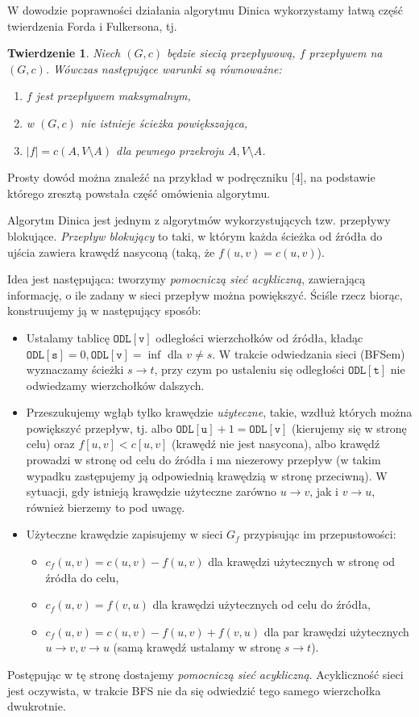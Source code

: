 \documentclass{article}
\newtheorem{twi}{Twierdzenie}
\begin{document}
W dowodzie poprawności działania algorytmu Dinica wykorzystamy łatwą część twierdzenia Forda i Fulkersona, tj.
\begin{twi} Niech $(G,c)$ będzie siecią przepływową, $f$ przepływem na $(G,c)$. Wówczas następujące warunki są równoważne:
  \begin{enumerate}
   \item $f$ jest przepływem maksymalnym, 
   \item w $(G,c)$ nie istnieje ścieżka powiększająca,
   \item $|f| = c(A, V\setminus A)$ dla pewnego przekroju $A, V\setminus A$.
  \end{enumerate}
\end{twi}
Prosty dowód można znaleźć na przykład w podręczniku [4], na podstawie którego zresztą powstała część omówienia algorytmu.

Algorytm Dinica jest jednym z algorytmów wykorzystujących tzw. przepływy blokujące. \emph{Przepływ blokujący} to taki, w którym każda ścieżka od źródła do ujścia zawiera krawędź nasyconą (taką, że $f(u,v) = c(u,v)$).

Idea jest następująca: tworzymy \emph{pomocniczą sieć acykliczną}, zawierającą informację, o ile zadany w sieci przepływ można powiększyć. Ściśle rzecz biorąc, konstruujemy ją w następujący sposób:
\begin{itemize}
\item Ustalamy tablicę $\mathtt{ODL[v]}$ odległości wierzchołków od źródła, kładąc $\mathtt{ODL[s]}=0, \mathtt{ODL[v]}=\inf$ dla $v\neq s$. W trakcie odwiedzania sieci (BFSem) wyznaczamy ścieżki $s\to t$, przy czym po ustaleniu się odległości $\mathtt{ODL[t]}$ nie odwiedzamy wierzchołków dalszych. 
\item Przeszukujemy wgłąb tylko krawędzie \emph{użyteczne}, takie, wzdłuż których można powiększyć przepływ, tj. albo $\mathtt{ODL[u]} +1 = \mathtt{ODL[v]}$ (kierujemy się w stronę celu) oraz $f[u,v] < c[u, v]$ (krawędź nie jest nasycona), albo krawędź prowadzi w stronę od celu do źródła i ma niezerowy przepływ (w takim wypadku zastępujemy ją odpowiednią krawędzią w stronę przeciwną). W sytuacji, gdy istnieją krawędzie użyteczne zarówno $u\to v$, jak i $v\to u$, również bierzemy to pod uwagę.
\item Użyteczne krawędzie zapisujemy w sieci $G_f$ przypisując im przepustowości:
\begin{itemize}
  \item $c_f (u,v) = c(u,v) - f(u,v)$ dla krawędzi użytecznych w stronę od źródła do celu, 
  \item $c_f (u,v) = f(v,u)$ dla krawędzi użytecznych od celu do źródła, 
  \item $c_f (u,v) = c(u,v) - f(u,v) + f(v,u)$ dla par krawędzi użytecznych $u\to v, v\to u$ (samą krawędź ustalamy w stronę $s\to t$).
\end{itemize}
\end{itemize}
Postępując w tę stronę dostajemy \emph{pomocniczą sieć acykliczną}. Acykliczność sieci jest oczywista, w trakcie BFS nie da się odwiedzić tego samego wierzchołka dwukrotnie. 
\end{document}

